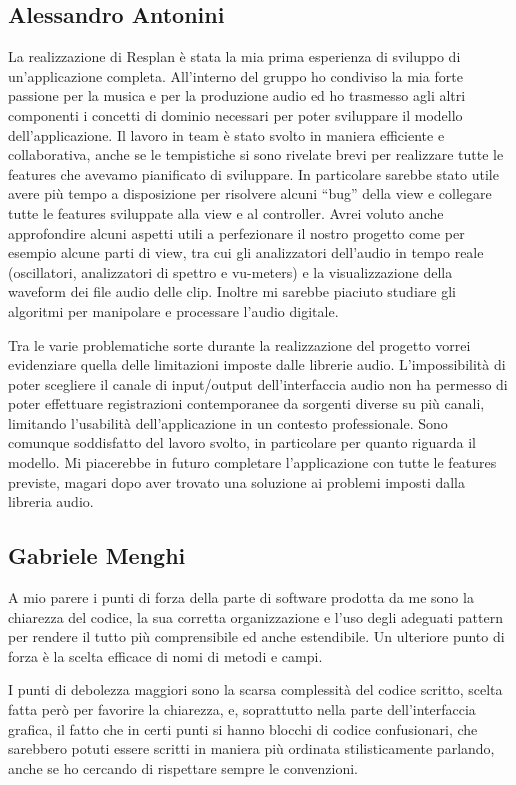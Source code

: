 \documentclass[a4paper,12pt]{report}
\begin{document}
\subsection{Alessandro Antonini}
La realizzazione di Resplan è stata la mia prima esperienza di sviluppo di un'applicazione completa. All’interno del gruppo ho condiviso la mia forte passione per la musica e per la produzione audio ed ho trasmesso agli altri componenti i concetti di dominio necessari per poter sviluppare il modello dell’applicazione.
Il lavoro in team è stato svolto in maniera efficiente e collaborativa, anche se le tempistiche si sono rivelate brevi per realizzare tutte le features che avevamo pianificato di sviluppare. In particolare sarebbe stato utile avere più tempo a disposizione per risolvere alcuni “bug” della view e collegare tutte le features sviluppate alla view e al controller.
Avrei voluto anche approfondire alcuni aspetti utili a perfezionare il nostro progetto come per esempio alcune parti di view, tra cui gli analizzatori dell’audio in tempo reale (oscillatori, analizzatori di spettro e vu-meters) e la visualizzazione della waveform dei file audio delle clip. Inoltre mi sarebbe piaciuto studiare gli algoritmi per manipolare e processare l’audio digitale.

Tra le varie problematiche sorte durante la realizzazione del progetto vorrei evidenziare quella delle limitazioni imposte dalle librerie audio. L’impossibilità di poter scegliere il canale di input/output dell’interfaccia audio non ha permesso di poter effettuare registrazioni contemporanee da sorgenti diverse su più canali, limitando l’usabilità dell’applicazione in un contesto professionale.
Sono comunque soddisfatto del lavoro svolto, in particolare per quanto riguarda il modello. 
Mi piacerebbe in futuro completare l’applicazione con tutte le features previste, magari dopo aver trovato una soluzione ai problemi imposti dalla libreria audio.

\subsection{Gabriele Menghi}
A mio parere i punti di forza della parte di software prodotta da me sono la chiarezza del codice, la sua corretta organizzazione e l’uso degli adeguati pattern per rendere il tutto più comprensibile ed anche estendibile. Un ulteriore punto di forza è la scelta efficace di nomi di metodi e campi. 

I punti di debolezza maggiori sono la scarsa complessità del codice scritto, scelta fatta però per favorire la chiarezza, e, soprattutto nella parte dell’interfaccia grafica, il fatto che in certi punti si hanno blocchi di codice confusionari, che sarebbero potuti essere scritti in maniera più ordinata stilisticamente parlando, anche se ho cercando di rispettare sempre le convenzioni.
\end{document}
